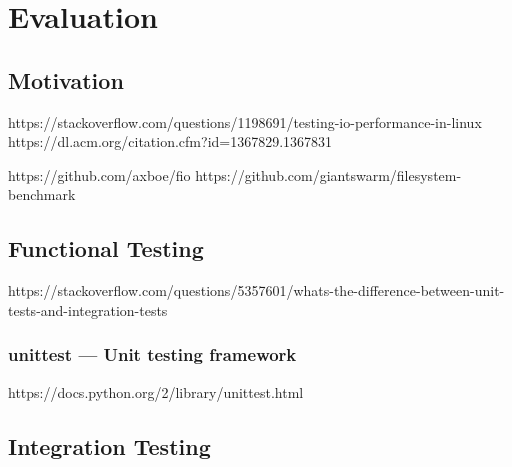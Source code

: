 \chapter{Evaluation}
\label{cha:evaluation}

\section{Motivation}
\label{sec:motivation}


https://stackoverflow.com/questions/1198691/testing-io-performance-in-linux
https://dl.acm.org/citation.cfm?id=1367829.1367831

https://github.com/axboe/fio
https://github.com/giantswarm/filesystem-benchmark

\section{Functional Testing}
\label{sec:rep_functional_testing}

https://stackoverflow.com/questions/5357601/whats-the-difference-between-unit-tests-and-integration-tests

\subsection{unittest — Unit testing framework}
\label{sub:unittest}

https://docs.python.org/2/library/unittest.html


\section{Integration Testing}
\label{sub:integration_testing}